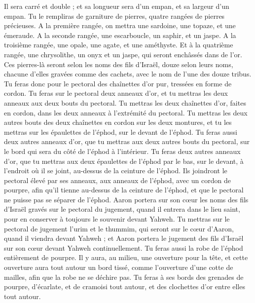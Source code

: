\begin{multicols}{2}
Il sera carré et double ; et sa longueur sera d’un empan, et sa largeur d'un empan.
Tu le rempliras de garniture de pierres, quatre rangées de pierres précieuses. A la première rangée, on mettra une sardoine, une topaze, et une émeraude.
A la seconde rangée, une escarboucle, un saphir, et un jaspe.
A la troisième rangée, une opale, une agate, et une améthyste.
Et à la quatrième rangée, une chrysolithe, un onyx et un jaspe, qui seront enchâssés dans de l'or.
Ces pierres-là seront selon les noms des fils d'Israël, douze selon leurs noms, chacune d'elles gravées comme des cachets, avec le nom de l’une des douze tribus.
Tu feras donc pour le pectoral des chaînettes d’or pur, tressées en forme de cordon.
Tu feras sur le pectoral deux anneaux d'or, et tu mettras les deux anneaux aux deux bouts du pectoral.
Tu mettras les deux chaînettes d'or, faites en cordon, dans les deux anneaux à l'extrémité du pectoral.
Tu mettras les deux autres bouts des deux chaînettes en cordon sur les deux montures, et tu les mettras sur les épaulettes de l'éphod, sur le devant de l'éphod.
Tu feras aussi deux autres anneaux d'or, que tu mettras aux deux autres bouts du pectoral, sur le bord qui sera du côté de l'éphod à l’intérieur.
Tu feras deux autres anneaux d'or, que tu mettras aux deux épaulettes de l'éphod par le bas, sur le devant, à l'endroit où il se joint, au-dessus de la ceinture de l'éphod.
Ils joindront le pectoral élevé par ses anneaux, aux anneaux de l'éphod, avec un cordon de pourpre, afin qu'il tienne au-dessus de la ceinture de l'éphod, et que le pectoral ne puisse pas se séparer de l'éphod.
Aaron portera sur son cœur les noms des fils d'Israël gravés sur le pectoral du jugement, quand il entrera dans le lieu saint, pour en conserver à toujours le souvenir devant Yahweh.
Tu mettras sur le pectoral de jugement l'urim et le thummim, qui seront sur le cœur d'Aaron, quand il viendra devant Yahweh ; et Aaron portera le jugement des fils d'Israël sur son cœur devant Yahweh continuellement.
Tu feras aussi la robe de l'éphod entièrement de pourpre.
Il y aura, au milieu, une ouverture pour la tête, et cette ouverture aura tout autour un bord tissé, comme l’ouverture d’une cotte de mailles, afin que la robe ne se déchire pas.
Tu feras à ses bords des grenades de pourpre, d'écarlate, et de cramoisi tout autour, et des clochettes d'or entre elles tout autour.

\end{multicols}

